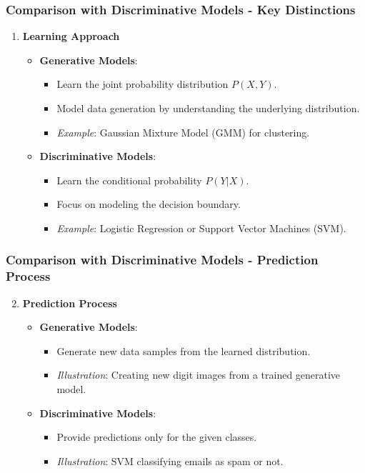\documentclass[aspectratio=169]{beamer}
\begin{document}
\begin{frame}[fragile]
    \frametitle{Comparison with Discriminative Models - Key Distinctions}
    \begin{enumerate}
        \item \textbf{Learning Approach}
        \begin{itemize}
            \item \textbf{Generative Models}:
            \begin{itemize}
                \item Learn the joint probability distribution \( P(X, Y) \).
                \item Model data generation by understanding the underlying distribution.
                \item \textit{Example}: Gaussian Mixture Model (GMM) for clustering.
            \end{itemize}
            \item \textbf{Discriminative Models}:
            \begin{itemize}
                \item Learn the conditional probability \( P(Y|X) \).
                \item Focus on modeling the decision boundary.
                \item \textit{Example}: Logistic Regression or Support Vector Machines (SVM).
            \end{itemize}
        \end{itemize}
    \end{enumerate}
\end{frame}

\begin{frame}[fragile]
    \frametitle{Comparison with Discriminative Models - Prediction Process}
    \begin{enumerate}
        \setcounter{enumi}{1}
        \item \textbf{Prediction Process}
        \begin{itemize}
            \item \textbf{Generative Models}:
            \begin{itemize}
                \item Generate new data samples from the learned distribution.
                \item \textit{Illustration}: Creating new digit images from a trained generative model.
            \end{itemize}
            \item \textbf{Discriminative Models}:
            \begin{itemize}
                \item Provide predictions only for the given classes.
                \item \textit{Illustration}: SVM classifying emails as spam or not.
            \end{itemize}
        \end{itemize}
    \end{enumerate}
\end{frame}
\end{document}
